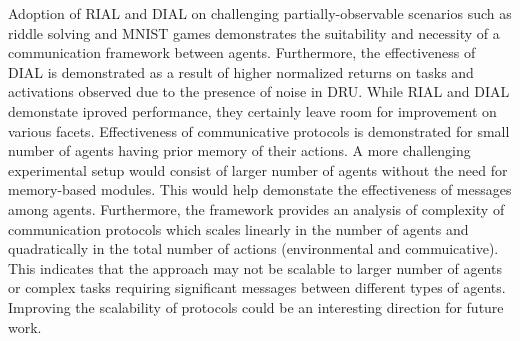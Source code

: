 \documentclass[11pt,letterpaper]{article}
\begin{document}
Adoption of RIAL and DIAL on challenging partially-observable scenarios such as riddle solving and MNIST games demonstrates the suitability and necessity of a communication framework between agents. Furthermore, the effectiveness of DIAL is demonstrated as a result of higher normalized returns on tasks and activations observed due to the presence of noise in DRU. While RIAL and DIAL demonstate iproved performance, they certainly leave room for improvement on various facets. Effectiveness of communicative protocols is demonstrated for small number of agents having prior memory of their actions. A more challenging experimental setup would consist of larger number of agents without the need for memory-based modules. This would help demonstate the effectiveness of messages among agents. Furthermore, the framework provides an analysis of complexity of communication protocols which scales linearly in the number of agents and quadratically in the total number of actions (environmental and commuicative). This indicates that the approach may not be scalable to larger number of agents or complex tasks requiring significant messages between different types of agents. Improving the scalability of protocols could be an interesting direction for future work. 
\end{document}

